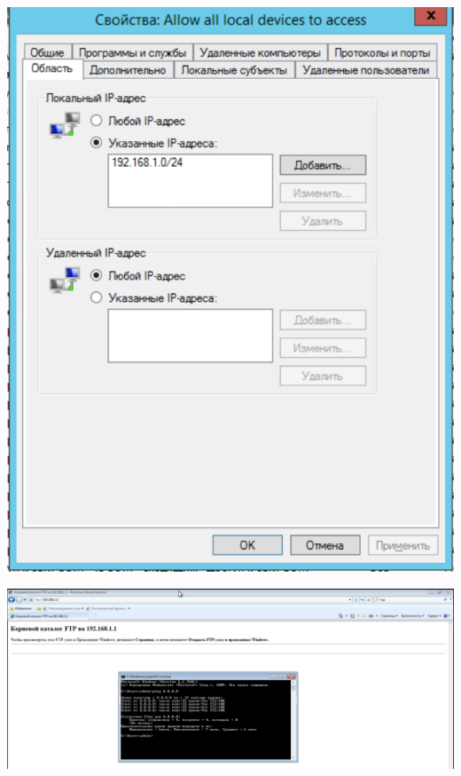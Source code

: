 \documentclass[a4paper,14pt]{extarticle}
\begin{document}
    \begin{center}
        \includegraphics[scale=0.7]{6.1.2.png}
    \end{center}

    \begin{center}
        \includegraphics[scale=0.4]{6.1.3.png}
    \end{center}
\end{document}
